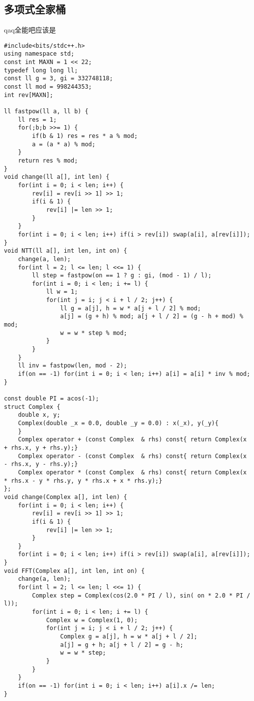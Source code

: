 \subsection{多项式全家桶}
qaq全能吧应该是
\begin{lstlisting}
#include<bits/stdc++.h>
using namespace std;
const int MAXN = 1 << 22;
typedef long long ll;
const ll g = 3, gi = 332748118;
const ll mod = 998244353;
int rev[MAXN];

ll fastpow(ll a, ll b) {
	ll res = 1;
	for(;b;b >>= 1) {
		if(b & 1) res = res * a % mod;
		a = (a * a) % mod;
	}
	return res % mod;
}
void change(ll a[], int len) {
	for(int i = 0; i < len; i++) {
		rev[i] = rev[i >> 1] >> 1;
		if(i & 1) {
			rev[i] |= len >> 1;
		}
	}
	for(int i = 0; i < len; i++) if(i > rev[i]) swap(a[i], a[rev[i]]);
}
void NTT(ll a[], int len, int on) {
	change(a, len);
	for(int l = 2; l <= len; l <<= 1) {
		ll step = fastpow(on == 1 ? g : gi, (mod - 1) / l);
		for(int i = 0; i < len; i += l) {
			ll w = 1;
			for(int j = i; j < i + l / 2; j++) {
				ll g = a[j], h = w * a[j + l / 2] % mod;
				a[j] = (g + h) % mod; a[j + l / 2] = (g - h + mod) % mod;
				w = w * step % mod;
			}
		}
	}
	ll inv = fastpow(len, mod - 2);
	if(on == -1) for(int i = 0; i < len; i++) a[i] = a[i] * inv % mod;
}

const double PI = acos(-1);
struct Complex {
	double x, y;
	Complex(double _x = 0.0, double _y = 0.0) : x(_x), y(_y){
	}
	Complex operator + (const Complex  & rhs) const{ return Complex(x + rhs.x, y + rhs.y);}
	Complex operator - (const Complex  & rhs) const{ return Complex(x - rhs.x, y - rhs.y);}
	Complex operator * (const Complex  & rhs) const{ return Complex(x * rhs.x - y * rhs.y, y * rhs.x + x * rhs.y);}
};
void change(Complex a[], int len) {
	for(int i = 0; i < len; i++) {
		rev[i] = rev[i >> 1] >> 1;
		if(i & 1) {
			rev[i] |= len >> 1;
		}
	}
	for(int i = 0; i < len; i++) if(i > rev[i]) swap(a[i], a[rev[i]]);
}
void FFT(Complex a[], int len, int on) {
	change(a, len);
	for(int l = 2; l <= len; l <<= 1) {
		Complex step = Complex(cos(2.0 * PI / l), sin( on * 2.0 * PI / l));
		for(int i = 0; i < len; i += l) {
			Complex w = Complex(1, 0);
			for(int j = i; j < i + l / 2; j++) {
				Complex g = a[j], h = w * a[j + l / 2];
				a[j] = g + h; a[j + l / 2] = g - h;
				w = w * step;
			}
		}
	}
	if(on == -1) for(int i = 0; i < len; i++) a[i].x /= len;
}


\end{lstlisting}
